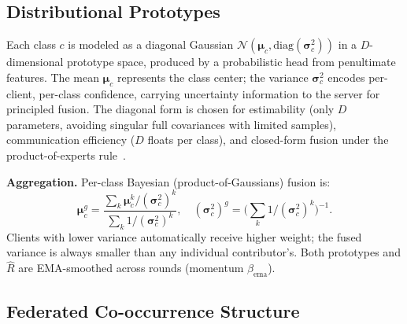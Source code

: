 \documentclass[conference]{IEEEtran}
\theoremstyle{definition}
\newcommand{\Rhat}{\widehat{R}}
\newcommand{\bc}{\boldsymbol{\mu}_c}
\newcommand{\sigc}{\boldsymbol{\sigma}_c^{2}}
\begin{document}
\subsection{Distributional Prototypes}
\label{sec:protos}

Each class $c$ is modeled as a diagonal Gaussian $\mathcal{N}(\bc,\mathrm{diag}(\sigc))$ in a $D$-dimensional prototype space, produced by a probabilistic head from penultimate features. The mean $\bc$ represents the class center; the variance $\sigc$ encodes per-client, per-class confidence, carrying uncertainty information to the server for principled fusion. The diagonal form is chosen for estimability (only $D$ parameters, avoiding singular full covariances with limited samples), communication efficiency ($D$ floats per class), and closed-form fusion under the product-of-experts rule~\cite{hinton2002poe}.

\noindent\textbf{Aggregation.} Per-class Bayesian (product-of-Gaussians) fusion is:
\begin{equation}
\boldsymbol\mu_c^{g}=\frac{\sum_k \bc^{k}/{(\sigc)}^{k}}{\sum_k 1/{(\sigc)}^{k}},\quad
{(\sigc)}^{g}=\Big(\sum_k 1/{(\sigc)}^{k}\Big)^{-1}.
\label{eq:bayesfusion}
\end{equation}
Clients with lower variance automatically receive higher weight; the fused variance is always smaller than any individual contributor's. Both prototypes and $\Rhat$ are EMA-smoothed across rounds (momentum $\beta_{\text{ema}}$).

\subsection{Federated Co-occurrence Structure}
\label{sec:cooc}
\end{document}
